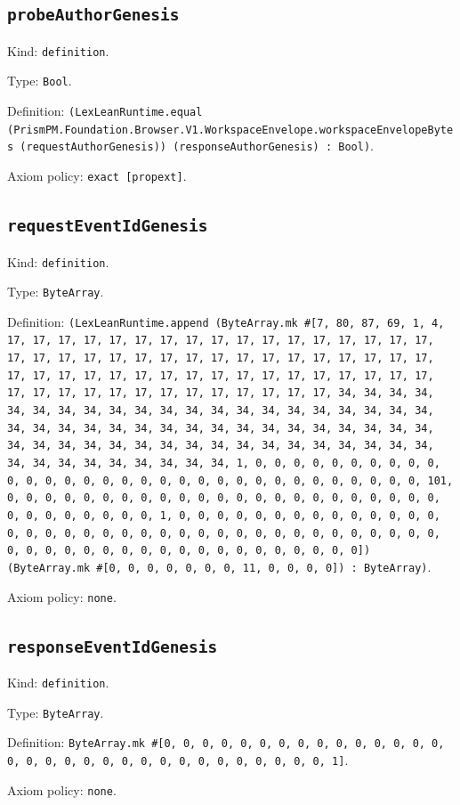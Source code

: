 \documentclass[11pt]{article}
\begin{document}
\subsection*{\texttt{probeAuthorGenesis}}
\noindent Kind: \texttt{definition}.\par
\noindent Type: \texttt{Bool}.\par
\noindent Definition: \texttt{(LexLeanRuntime.equal (PrismPM.Foundation.Browser.V1.WorkspaceEnvelope.workspaceEnvelopeBytes (requestAuthorGenesis)) (responseAuthorGenesis) : Bool)}.\par
\noindent Axiom policy: \texttt{exact [propext]}.\par
\subsection*{\texttt{requestEventIdGenesis}}
\noindent Kind: \texttt{definition}.\par
\noindent Type: \texttt{ByteArray}.\par
\noindent Definition: \texttt{(LexLeanRuntime.append (ByteArray.mk \#[7, 80, 87, 69, 1, 4, 17, 17, 17, 17, 17, 17, 17, 17, 17, 17, 17, 17, 17, 17, 17, 17, 17, 17, 17, 17, 17, 17, 17, 17, 17, 17, 17, 17, 17, 17, 17, 17, 17, 17, 17, 17, 17, 17, 17, 17, 17, 17, 17, 17, 17, 17, 17, 17, 17, 17, 17, 17, 17, 17, 17, 17, 17, 17, 17, 17, 17, 17, 17, 17, 34, 34, 34, 34, 34, 34, 34, 34, 34, 34, 34, 34, 34, 34, 34, 34, 34, 34, 34, 34, 34, 34, 34, 34, 34, 34, 34, 34, 34, 34, 34, 34, 34, 34, 34, 34, 34, 34, 34, 34, 34, 34, 34, 34, 34, 34, 34, 34, 34, 34, 34, 34, 34, 34, 34, 34, 34, 34, 34, 34, 34, 34, 34, 34, 1, 0, 0, 0, 0, 0, 0, 0, 0, 0, 0, 0, 0, 0, 0, 0, 0, 0, 0, 0, 0, 0, 0, 0, 0, 0, 0, 0, 0, 0, 0, 0, 0, 101, 0, 0, 0, 0, 0, 0, 0, 0, 0, 0, 0, 0, 0, 0, 0, 0, 0, 0, 0, 0, 0, 0, 0, 0, 0, 0, 0, 0, 0, 0, 0, 1, 0, 0, 0, 0, 0, 0, 0, 0, 0, 0, 0, 0, 0, 0, 0, 0, 0, 0, 0, 0, 0, 0, 0, 0, 0, 0, 0, 0, 0, 0, 0, 0, 0, 0, 0, 0, 0, 0, 0, 0, 0, 0, 0, 0, 0, 0, 0, 0, 0, 0, 0, 0, 0, 0, 0, 0]) (ByteArray.mk \#[0, 0, 0, 0, 0, 0, 0, 11, 0, 0, 0, 0]) : ByteArray)}.\par
\noindent Axiom policy: \texttt{none}.\par
\subsection*{\texttt{responseEventIdGenesis}}
\noindent Kind: \texttt{definition}.\par
\noindent Type: \texttt{ByteArray}.\par
\noindent Definition: \texttt{ByteArray.mk \#[0, 0, 0, 0, 0, 0, 0, 0, 0, 0, 0, 0, 0, 0, 0, 0, 0, 0, 0, 0, 0, 0, 0, 0, 0, 0, 0, 0, 0, 0, 0, 0, 1]}.\par
\noindent Axiom policy: \texttt{none}.\par
\end{document}
